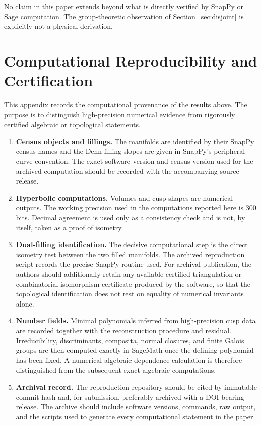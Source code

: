 \documentclass[11pt,a4paper]{article}
\theoremstyle{definition}
\theoremstyle{remark}
\begin{document}
No claim in this paper extends beyond what is directly verified by
SnapPy or Sage computation. The group-theoretic observation of
Section~\ref{sec:disjoint} is explicitly not a physical derivation.

\appendix
\section{Computational Reproducibility and Certification}\label{app:repro}

This appendix records the computational provenance of the results above.
The purpose is to distinguish high-precision numerical evidence from
rigorously certified algebraic or topological statements.

\begin{enumerate}
\item \textbf{Census objects and fillings.}
The manifolds are identified by their SnapPy census names and the Dehn
filling slopes are given in SnapPy's peripheral-curve convention.
The exact software version and census version used for the archived
computation should be recorded with the accompanying source release.

\item \textbf{Hyperbolic computations.}
Volumes and cusp shapes are numerical outputs. The working precision
used in the computations reported here is 300 bits. Decimal agreement
is used only as a consistency check and is not, by itself, taken as a
proof of isometry.

\item \textbf{Dual-filling identification.}
The decisive computational step is the direct isometry test between
the two filled manifolds. The archived reproduction script records
the precise SnapPy routine used. For archival publication, the
authors should additionally retain any available certified
triangulation or combinatorial isomorphism certificate produced by
the software, so that the topological identification does not rest
on equality of numerical invariants alone.

\item \textbf{Number fields.}
Minimal polynomials inferred from high-precision cusp data are recorded
together with the reconstruction procedure and residual. Irreducibility,
discriminants, composita, normal closures, and finite Galois groups are
then computed exactly in SageMath once the defining polynomial has been
fixed. A numerical algebraic-dependence calculation is therefore
distinguished from the subsequent exact algebraic computations.

\item \textbf{Archival record.}
The reproduction repository should be cited by immutable commit hash
and, for submission, preferably archived with a DOI-bearing release.
The archive should include software versions, commands, raw output, and
the scripts used to generate every computational statement in the paper.
\end{enumerate}
\end{document}
